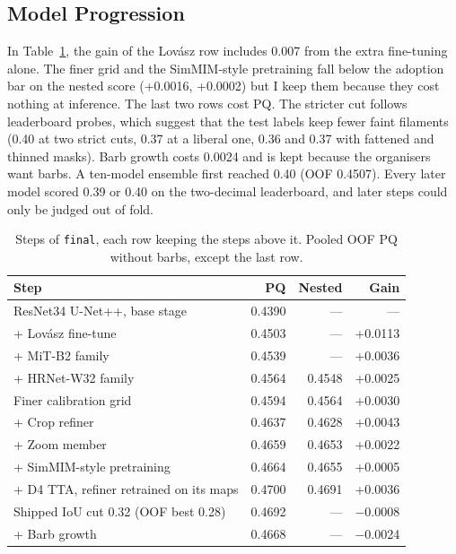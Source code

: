 \documentclass[sigconf,pbalance]{acmart}
\begin{document}
    \subsection{Model Progression}\label{subsec:progression}
    In Table~\ref{tab:progression}, the gain of the Lovász row includes 0.007 from the extra fine-tuning alone.
    The finer grid and the SimMIM-style pretraining fall below the adoption bar on the nested score (+0.0016, +0.0002) but I keep them because they cost nothing at inference.
    The last two rows cost PQ\@.
    The stricter cut follows leaderboard probes, which suggest that the test labels keep fewer faint filaments (0.40 at two strict cuts, 0.37 at a liberal one, 0.36 and 0.37 with fattened and thinned masks).
    Barb growth costs 0.0024 and is kept because the organisers want barbs.
    A ten-model ensemble first reached 0.40 (OOF 0.4507).
    Every later model scored 0.39 or 0.40 on the two-decimal leaderboard, and later steps could only be judged out of fold.

    \begin{table}[t]
        \caption{Steps of \texttt{final}, each row keeping the steps above it.
        Pooled OOF PQ without barbs, except the last row.}\label{tab:progression}
        \footnotesize
        \begin{tabular}{lrrr}
            \toprule
            Step & PQ & Nested & Gain \\
            \midrule
            ResNet34 U-Net++, base stage & 0.4390 & --- & --- \\
            + Lovász fine-tune & 0.4503 & --- & +0.0113 \\
            + MiT-B2 family & 0.4539 & --- & +0.0036 \\
            + HRNet-W32 family & 0.4564 & 0.4548 & +0.0025 \\
            Finer calibration grid & 0.4594 & 0.4564 & +0.0030 \\
            + Crop refiner & 0.4637 & 0.4628 & +0.0043 \\
            + Zoom member & 0.4659 & 0.4653 & +0.0022 \\
            + SimMIM-style pretraining & 0.4664 & 0.4655 & +0.0005 \\
            + D4 TTA, refiner retrained on its maps & 0.4700 & 0.4691 & +0.0036 \\
            Shipped IoU cut 0.32 (OOF best 0.28) & 0.4692 & --- & $-$0.0008 \\
            + Barb growth & 0.4668 & --- & $-$0.0024 \\
            \bottomrule
        \end{tabular}
    \end{table}
\end{document}
